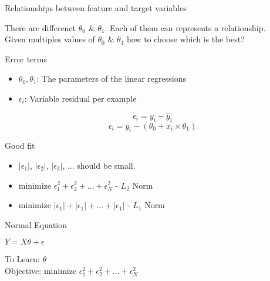 \documentclass{beamer}
\begin{document}
\begin{frame}{Relationships between feature and target variables}
    
    There are differenct $\theta_{0}$ $\&$ $\theta_{1}$. Each of them can represents a relationship.\\
    \vspace{0.5em}
    Given multiples values of $\theta_{0}$ $\&$ $\theta_{1}$ how to choose which is the  best?
    
\end{frame}
\begin{frame}{Error terms}
\begin{itemize}
    \item $\theta_{0}, \theta_{1}$: The parameters of the linear regressions
    \item $\epsilon_{i}$: Variable residual per example 
\end{itemize}


\begin{equation*}
    \epsilon_{i} = y_{i} - \hat{y}_{i}
\end{equation*}
\begin{equation*}
    \epsilon_{i} = y_{i} - (\theta_{0} + x_{i}\times\theta_{1})
\end{equation*}
\end{frame}



\begin{frame}{Good fit}

\begin{itemize}
    \item $|\epsilon_{1}|$, $|\epsilon_{2}|$, $|\epsilon_{3}|$, ... should be small.
    \item 
${\text{minimize }} \epsilon_{1}^2 + \epsilon_{2}^2 + \dots + \epsilon_{N}^2$ - $L_{2}$ Norm
    \item 
${\text{minimize }} |\epsilon_{1}| + |\epsilon_{1}| + \dots + |\epsilon_{1}|$ - $L_{1}$ Norm
\end{itemize}
\end{frame}



\begin{frame}{Normal Equation}
    
    
    \begin{tcolorbox}
       $ Y = X\theta + \epsilon$
    \end{tcolorbox}
    
    To Learn: $\theta$ \\
    Objective: ${\text{minimize }} \epsilon_{1}^2 + \epsilon_{2}^2 + \dots + \epsilon_{N}^2$  
\end{frame}
\end{document}
